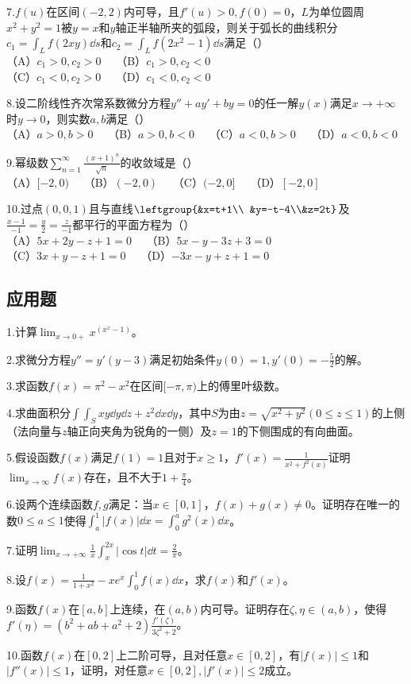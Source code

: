 7.$f(u)$在区间$(-2,2)$内可导，且$f'(u)>0,f(0)=0$，$L$为单位圆周$x^2+y^2=1$被$y=x$和$y$轴正半轴所夹的弧段，则关于弧长的曲线积分$c_1=\int_{L}f(2xy)\dd{s}$和$c_2=\int_{L}f(2x^2-1)\dd{s}$满足（）\\
（A）$c_1>0,c_2>0\quad$ （B）$c_1>0,c_2<0$\\
 （C）$c_1<0,c_2>0\quad$ （D）$c_1<0,c_2<0$

8.设二阶线性齐次常系数微分方程$y''+ay'+by=0$的任一解$y(x)$满足$x \to +\infty$时$y \to 0$，则实数$a,b$满足（）\\
（A）$a>0,b>0\quad$ （B）$a>0,b<0\quad$ （C）$a<0,b>0\quad$ （D）$a<0,b<0$

9.幂级数$\displaystyle \sum_{n=1}^{\infty} \frac{(x+1)^n}{\sqrt{n}}$的收敛域是（）\\
（A）$[-2,0)\quad$ （B）$(-2,0)\quad$ （C）$(-2,0]\quad$ （D）$[-2,0]$

10.过点$(0,0,1)$且与直线$\leftgroup{&x=t+1\\ &y=-t-4\\&z=2t}$及$\frac{x-1}{-1}=\frac{y}{2}=\frac{z}{-1}$都平行的平面方程为（）\\
（A）$5x+2y-z+1=0\quad$ （B）$5x-y-3z+3=0$\\
（C）$3x+y-z+1=0\quad$ （D）$-3x-y+z+1=0$


\subsection{应用题}
1.计算$\displaystyle \lim_{x \to 0+}x^{(x^x-1)}$。


2.求微分方程$y''=y'(y-3)$满足初始条件$y(0)=1,y'(0)=-\frac{5}{2}$的解。


3.求函数$f(x)=\pi ^2-x^2$在区间$[-\pi,\pi)$上的傅里叶级数。

4.求曲面积分$\int \int_{S}xy\dd{y}\dd{z}+z^2\dd{x}\dd{y}$，其中$S$为由$z=\sqrt{x^2+y^2}(0\leqslant z \leqslant 1)$的上侧（法向量与$z$轴正向夹角为锐角的一侧）及$z=1$的下侧围成的有向曲面。

5.假设函数$f(x)$满足$f(1)=1$且对于$x\geqslant 1$，$f'(x)=\frac{1}{x^2+f^2(x)}$证明$\displaystyle \lim_{x \to \infty }f(x)$存在，且不大于$1+\frac{\pi}{4}$。

6.设两个连续函数$f,g$满足：当$x \in [0,1]$，$f(x)+g(x)\neq0$。证明存在唯一的数$0\leqslant a \leqslant 1$使得$\int_{a}^{1}|f(x)|\dd{x}=\int_{0}^{a}g^2(x)\dd{x}$。

7.证明$\displaystyle \lim_{x \to +\infty}\frac{1}{x}\int_x^{2x}|\cos t|\dd{t}=\frac{2}{\pi}$。

8.设$f(x)=\frac{1}{1+x^2}-xe^x\int_0^1 f(x)\dd{x}$，求$f(x)$和$f'(x)$。

9.函数$f(x)$在$[a,b]$上连续，在$(a,b)$内可导。证明存在$\zeta,\eta \in (a,b)$，使得$f'(\eta)=(b^2+ab+a^2+2)\frac{f'(\zeta)}{3 \zeta ^2 +2}$。

10.函数$f(x)$在$[0,2]$上二阶可导，且对任意$x \in [0,2]$，有$|f(x)| \leqslant  1$和$|f''(x)| \leqslant 1$，证明，对任意$x \in [0,2],|f'(x)|\leqslant 2$成立。

